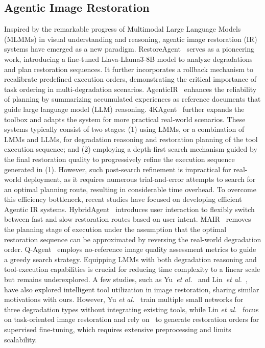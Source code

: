 \subsection{Agentic Image Restoration}
Inspired by the remarkable progress of Multimodal Large Language Models (MLMMs) in visual understanding and reasoning, agentic image restoration (IR) systems have emerged as a new paradigm. 
RestoreAgent~\cite{chen2024restoreagent} serves as a pioneering work, introducing a fine-tuned Llava-Llama3-8B model to analyze degradations and plan restoration sequences. It further incorporates a rollback mechanism to recalibrate predefined execution orders, demonstrating the critical importance of task ordering in multi-degradation scenarios.
AgenticIR~\cite{zhu2024intelligent} enhances the reliability of planning by summarizing accumulated experiences as reference documents that guide large language model (LLM) reasoning.
4KAgent~\cite{zuo20254kagent} further expands the toolbox and adapts the system for more practical real-world scenarios. 
These systems typically consist of two stages:
(1) using LMMs, or a combination of LMMs and LLMs, for degradation reasoning and restoration planning of the tool execution sequence; and
(2) employing a depth-first search mechanism guided by the final restoration quality to progressively refine the execution sequence generated in (1).
However, such post-search refinement is impractical for real-world deployment, as it requires numerous trial-and-error attempts to search for an optimal planning route, resulting in considerable time overhead. To overcome this efficiency bottleneck, recent studies have focused on developing efficient Agentic IR systems.
HybridAgent~\cite{li2025hybrid} introduces user interaction to flexibly switch between fast and slow restoration routes based on user intent.
MAIR~\cite{jiang2025multi} removes the planning stage of execution under the assumption that the optimal restoration sequence can be approximated by reversing the real-world degradation order.
Q-Agent~\cite{zhou2025q} employs no-reference image quality assessment metrics to guide a greedy search strategy. Equipping LMMs with both degradation reasoning and tool-execution capabilities is crucial for reducing time complexity to a linear scale but remains underexplored. A few studies, such as Yu~\textit{et al.}~\cite{yu2018crafting} and Lin~\textit{et al.}~\cite{lin2025jarvisir}, have also explored intelligent tool utilization in image restoration, sharing similar motivations with ours.
However, Yu \textit{et al.}~\cite{yu2018crafting} train multiple small networks for three degradation types without integrating existing tools, while Lin \textit{et al.}~\cite{lin2025jarvisir} focus on task-oriented image restoration and rely on~\cite{chen2024restoreagent} to generate restoration orders for supervised fine-tuning, which requires extensive preprocessing and limits scalability.


